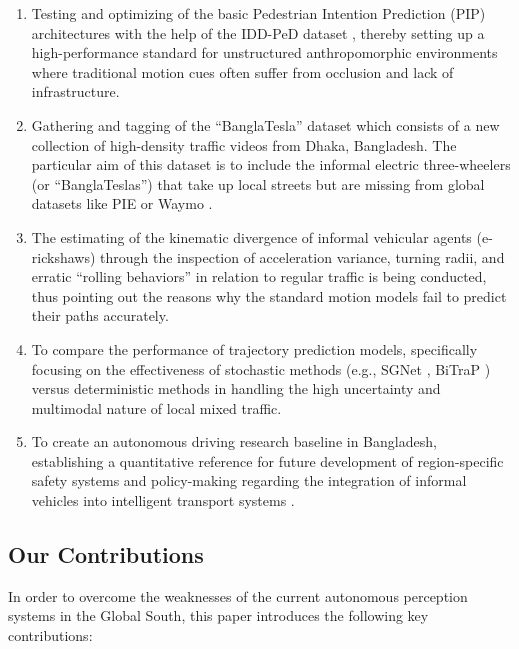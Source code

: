 \documentclass[12pt, a4paper]{article}
\begin{document}
\begin{enumerate}
    \item Testing and optimizing of the basic Pedestrian Intention Prediction (PIP) architectures with the help of the IDD-PeD dataset \cite{bokkasam2025pedestrian}, thereby setting up a high-performance standard for unstructured anthropomorphic environments where traditional motion cues often suffer from occlusion and lack of infrastructure.
    
    \item Gathering and tagging of the ``BanglaTesla'' dataset which consists of a new collection of high-density traffic videos from Dhaka, Bangladesh. The particular aim of this dataset is to include the informal electric three-wheelers (or ``BanglaTeslas'') \cite{jagonews2025banglatesla} that take up local streets but are missing from global datasets like PIE \cite{rasouli2019pie} or Waymo \cite{sun2020scalability}.
    
    \item The estimating of the kinematic divergence of informal vehicular agents (e-rickshaws) through the inspection of acceleration variance, turning radii, and erratic ``rolling behaviors'' \cite{vasudevan2020pedestrian} in relation to regular traffic is being conducted, thus pointing out the reasons why the standard motion models fail to predict their paths accurately.
    
    \item To compare the performance of trajectory prediction models, specifically focusing on the effectiveness of stochastic methods (e.g., SGNet \cite{wang2022stepwise}, BiTraP \cite{yao2021bitrap}) versus deterministic methods in handling the high uncertainty and multimodal nature of local mixed traffic.
    
    \item To create an autonomous driving research baseline in Bangladesh, establishing a quantitative reference for future development of region-specific safety systems and policy-making regarding the integration of informal vehicles into intelligent transport systems \cite{parikh2024idd}.
\end{enumerate}


\subsection{Our Contributions}

In order to overcome the weaknesses of the current autonomous perception systems in the Global South, this paper introduces the following key contributions:
\end{document}
